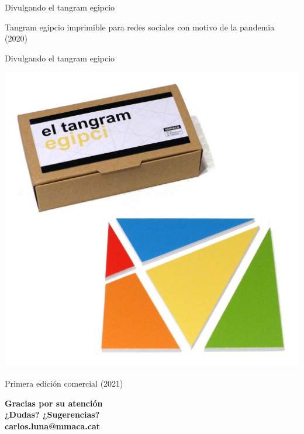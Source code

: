 \documentclass[14pt,aspectratio=169,usenames,dvipsnames]{beamer}
\begin{document}

    \begin{frame}{Divulgando el tangram egipcio}
        \begin{center}
            \begin{minipage}{0.4\textwidth}
            \end{minipage}\quad\begin{minipage}{0.5\textwidth}
                Tangram egipcio imprimible para redes sociales con motivo de la pandemia (2020)
            \end{minipage}
        \end{center}
    \end{frame}


    \begin{frame}{Divulgando el tangram egipcio}
        \begin{center}
            \includegraphics[height=25ex]{pictures/Primera Edició.jpg} \\

            \bigskip

            Primera edición comercial (2021)
        \end{center}
    \end{frame}


    \begin{frame}{}
        \begin{center}
            \textbf{\huge Gracias por su atención\\\vspace{0.75em} {\Large¿Dudas? ¿Sugerencias?}\\\vspace{0.75em} {\large carlos.luna@mmaca.cat}}
        \end{center}
    \end{frame}

\end{document}
